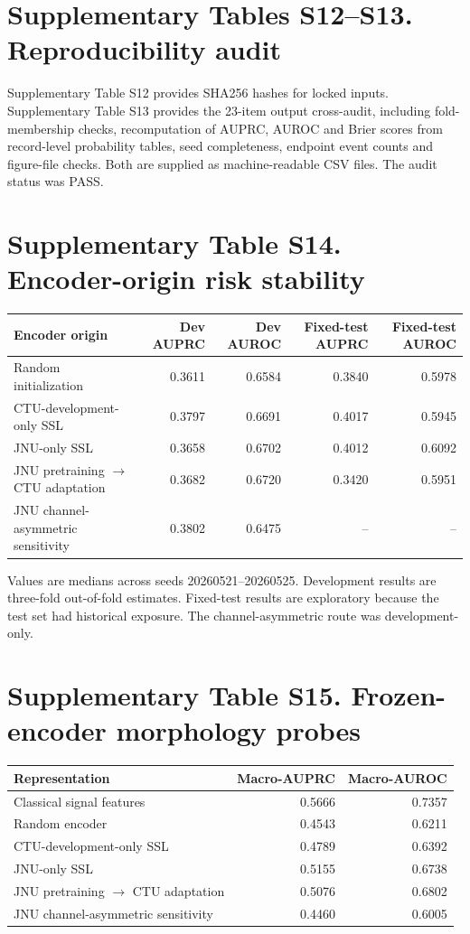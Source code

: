 \documentclass[11pt]{article}
\begin{document}
\section*{Supplementary Tables S12--S13. Reproducibility audit}

Supplementary Table S12 provides SHA256 hashes for locked inputs. Supplementary Table S13 provides the 23-item output cross-audit, including fold-membership checks, recomputation of AUPRC, AUROC and Brier scores from record-level probability tables, seed completeness, endpoint event counts and figure-file checks. Both are supplied as machine-readable CSV files. The audit status was PASS.

\section*{Supplementary Table S14. Encoder-origin risk stability}
{\small
\begin{tabularx}{\textwidth}{>{\raggedright\arraybackslash}Xrrrr}
\toprule
Encoder origin & Dev AUPRC & Dev AUROC & Fixed-test AUPRC & Fixed-test AUROC \\
\midrule
Random initialization & 0.3611 & 0.6584 & 0.3840 & 0.5978 \\
CTU-development-only SSL & 0.3797 & 0.6691 & 0.4017 & 0.5945 \\
JNU-only SSL & 0.3658 & 0.6702 & 0.4012 & 0.6092 \\
JNU pretraining $\rightarrow$ CTU adaptation & 0.3682 & 0.6720 & 0.3420 & 0.5951 \\
JNU channel-asymmetric sensitivity & 0.3802 & 0.6475 & -- & -- \\
\bottomrule
\end{tabularx}
}

Values are medians across seeds 20260521--20260525. Development results are three-fold out-of-fold estimates. Fixed-test results are exploratory because the test set had historical exposure. The channel-asymmetric route was development-only.

\section*{Supplementary Table S15. Frozen-encoder morphology probes}
\begin{tabular}{lrr}
\toprule
Representation & Macro-AUPRC & Macro-AUROC \\
\midrule
Classical signal features & 0.5666 & 0.7357 \\
Random encoder & 0.4543 & 0.6211 \\
CTU-development-only SSL & 0.4789 & 0.6392 \\
JNU-only SSL & 0.5155 & 0.6738 \\
JNU pretraining $\rightarrow$ CTU adaptation & 0.5076 & 0.6802 \\
JNU channel-asymmetric sensitivity & 0.4460 & 0.6005 \\
\bottomrule
\end{tabular}
\end{document}
